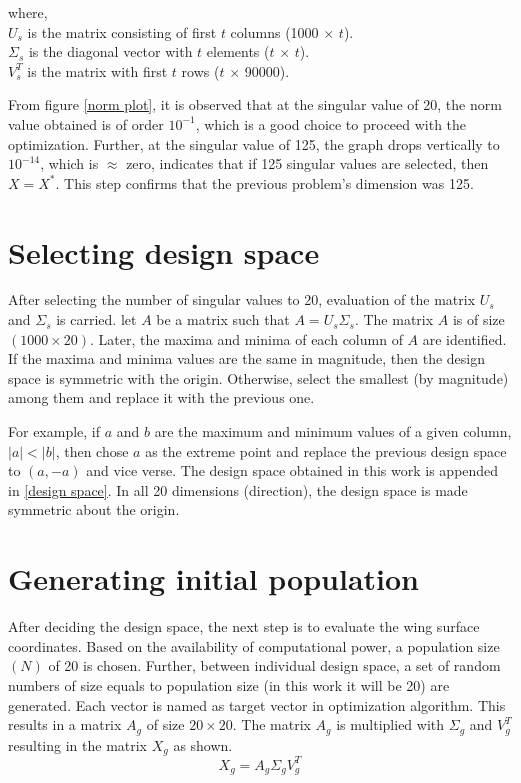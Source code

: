 where,\\
$U_s$ is the matrix consisting of first $t$ columns (1000 $\times$ $t$).\\
$\Sigma_s$ is the diagonal vector with $t$ elements ($t$ $\times$ $t$).\\
$V^T_s$ is the matrix with first $t$ rows ($t$ $\times$ 90000).

From figure \ref{norm plot}, it is observed that at the singular value of 20, the norm value obtained is of order $10^{-1}$, which is a good choice to proceed with the optimization. Further, at the singular value of 125, the graph drops vertically to $10^{-14}$, which is $\approx$ zero, indicates that if 125 singular values are selected, then $X=X^*$. This step confirms that the previous problem's dimension was 125.

\section{Selecting design space}
After selecting the number of singular values to 20, evaluation of the matrix $U_s$ and $\Sigma_s$ is carried. let $A$ be a matrix such that $A = U_s \Sigma_s$. The matrix $A$ is of size $(1000 \times 20)$. Later, the maxima and minima of each column of $A$ are identified. If the maxima and minima values are the same in magnitude, then the design space is symmetric with the origin. Otherwise, select the smallest (by magnitude) among them and replace it with the previous one.

For example, if $a$ and $b$ are the maximum and minimum values of a given column, $|a|<|b|$, then chose $a$ as the extreme point and replace the previous design space to $(a, -a)$ and vice verse. The design space obtained in this work is appended in \ref{design space}. In all 20 dimensions (direction), the design space is made symmetric about the origin.

\section{Generating initial population}
After deciding the design space, the next step is to evaluate the wing surface coordinates. Based on the availability of computational power, a population size $(N)$ of 20 is chosen. Further, between individual design space, a set of random numbers of size equals to population size (in this work it will be 20) are generated. Each vector is named as target vector in optimization algorithm. This results in a matrix $A_g$ of size $20 \times 20$. The matrix $A_g$ is multiplied with $\Sigma_g$ and $V^T_g$ resulting in the matrix $X_g$ as shown.
$$ X_g = A_g \Sigma_g V^T_g $$

